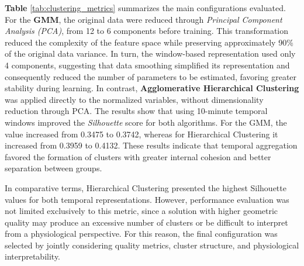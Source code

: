 \documentclass[a4paper,fleqn]{cas-sc}
\begin{document}
\begin{center}
\label{tab:clustering_metrics}
\end{center}

\textbf{Table} \ref{tab:clustering_metrics} summarizes the main configurations evaluated. For the \textbf{GMM}, the original data were reduced through \textit{Principal Component Analysis (PCA)}, from 12 to 6 components before training. This transformation reduced the complexity of the feature space while preserving approximately 90\% of the original data variance. In turn, the window-based representation used only 4 components, suggesting that data smoothing simplified its representation and consequently reduced the number of parameters to be estimated, favoring greater stability during learning. In contrast, \textbf{Agglomerative Hierarchical Clustering} was applied directly to the normalized variables, without dimensionality reduction through PCA. The results show that using 10-minute temporal windows improved the \textit{Silhouette} score for both algorithms. For the GMM, the value increased from 0.3475 to 0.3742, whereas for Hierarchical Clustering it increased from 0.3959 to 0.4132. These results indicate that temporal aggregation favored the formation of clusters with greater internal cohesion and better separation between groups.

In comparative terms, Hierarchical Clustering presented the highest Silhouette values for both temporal representations. However, performance evaluation was not limited exclusively to this metric, since a solution with higher geometric quality may produce an excessive number of clusters or be difficult to interpret from a physiological perspective. For this reason, the final configuration was selected by jointly considering quality metrics, cluster structure, and physiological interpretability.
\end{document}

